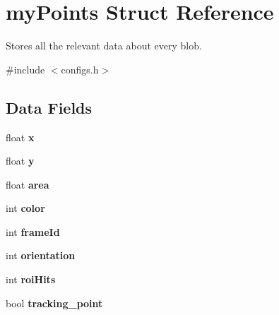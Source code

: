 \hypertarget{structmyPoints}{\section{my\-Points Struct Reference}
\label{structmyPoints}
}


Stores all the relevant data about every blob.  




{\ttfamily \#include $<$configs.\-h$>$}

\subsection*{Data Fields}
\begin{DoxyCompactItemize}
\item 
\hypertarget{structmyPoints_a532da094c55f61051dd445686c61cef6}{float {\bfseries x}}\label{structmyPoints_a532da094c55f61051dd445686c61cef6}

\item 
\hypertarget{structmyPoints_a372f5f275db036815221a3e81ebe6609}{float {\bfseries y}}\label{structmyPoints_a372f5f275db036815221a3e81ebe6609}

\item 
\hypertarget{structmyPoints_a32ac6e1745db8517cca195c222aabf1a}{float {\bfseries area}}\label{structmyPoints_a32ac6e1745db8517cca195c222aabf1a}

\item 
\hypertarget{structmyPoints_ab27e9d4d24aa5944e899d428be3986c5}{int {\bfseries color}}\label{structmyPoints_ab27e9d4d24aa5944e899d428be3986c5}

\item 
\hypertarget{structmyPoints_a51b02c7ec75719ebe9cb953b3173c82a}{int {\bfseries frame\-Id}}\label{structmyPoints_a51b02c7ec75719ebe9cb953b3173c82a}

\item 
\hypertarget{structmyPoints_a628fce751be72e8d4d3cb46fa3308676}{int {\bfseries orientation}}\label{structmyPoints_a628fce751be72e8d4d3cb46fa3308676}

\item 
\hypertarget{structmyPoints_a2e995d18bda128db1d7a047f326cd94d}{int {\bfseries roi\-Hits}}\label{structmyPoints_a2e995d18bda128db1d7a047f326cd94d}

\item 
\hypertarget{structmyPoints_afece029e0604c31fd3b718f4d4fbc771}{bool {\bfseries tracking\-\_\-point}}\label{structmyPoints_afece029e0604c31fd3b718f4d4fbc771}


\end{DoxyCompactItemize}
